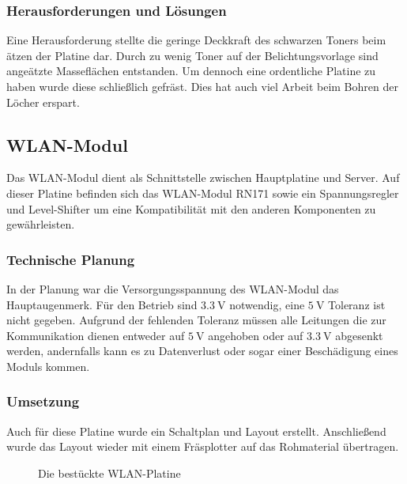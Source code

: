     \subsubsection{Herausforderungen und Lösungen}
    Eine Herausforderung stellte die geringe Deckkraft des schwarzen Toners beim ätzen der Platine dar. Durch zu wenig Toner auf der Belichtungsvorlage sind
    angeätzte Masseflächen entstanden. Um dennoch eine ordentliche Platine zu haben wurde diese schließlich gefräst. Dies hat auch viel Arbeit beim Bohren der
    Löcher erspart.

  \subsection{WLAN-Modul}
  Das WLAN-Modul dient als Schnittstelle zwischen Hauptplatine und Server. Auf dieser Platine befinden sich das WLAN-Modul RN171 sowie ein Spannungsregler und Level-Shifter
  um eine Kompatibilität mit den anderen Komponenten zu gewährleisten.

    \subsubsection{Technische Planung}
    In der Planung war die Versorgungsspannung des WLAN-Modul das Hauptaugenmerk. Für den Betrieb sind $\SI{3.3}{\volt}$ notwendig, eine $\SI{5}{\volt}$ Toleranz ist nicht gegeben.
    Aufgrund der fehlenden Toleranz müssen alle Leitungen die zur Kommunikation dienen entweder auf $\SI{5}{\volt}$ angehoben oder auf $\SI{3.3}{\volt}$ abgesenkt werden,
    andernfalls kann es zu Datenverlust oder sogar einer Beschädigung eines Moduls kommen.

    \subsubsection{Umsetzung}
    Auch für diese Platine wurde ein Schaltplan und Layout erstellt. Anschließend wurde das Layout wieder mit einem Fräsplotter auf das Rohmaterial übertragen.

    \begin{figure}[tbh]
      \begin{centering}
      \par\end{centering}
      \caption{Die bestückte WLAN-Platine}
      \label{WLAN-Platine}
    \end{figure}

